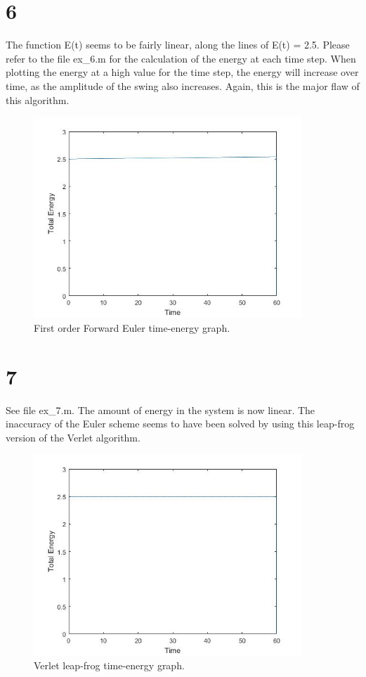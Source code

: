 \documentclass[12pt, a4paper]{article}
\begin{document}
	\part*{6}
	The function E(t) seems to be fairly linear, along the lines of E(t) = 2.5. Please refer to the file ex\_6.m for the calculation of the energy at each time step. When plotting the energy at a high value for the time step, the energy will increase over time, as the amplitude of the swing also increases. Again, this is the major flaw of this algorithm.
	\begin{figure}[!ht]
		\centering
		\includegraphics[width=0.9\textwidth]{6}
		\caption{First order Forward Euler time-energy graph.}
	\end{figure}
	\part*{7}
	See file ex\_7.m. The amount of energy in the system is now linear. The inaccuracy of the Euler scheme seems to have been solved by using this leap-frog version of the Verlet algorithm.
	\begin{figure}[!ht]
		\centering
		\includegraphics[width=0.9\textwidth]{7}
		\caption{Verlet leap-frog time-energy graph.}
	\end{figure}
\end{document}
